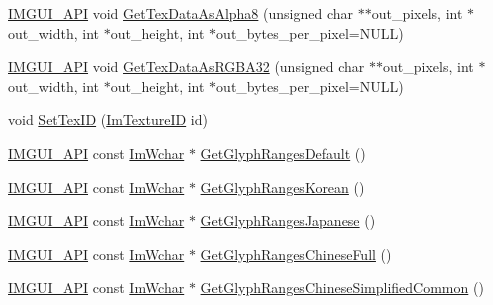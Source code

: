 \begin{DoxyCompactItemize}
\mbox{\hyperlink{imgui_8h_a43829975e84e45d1149597467a14bbf5}{I\+M\+G\+U\+I\+\_\+\+A\+PI}} void \mbox{\hyperlink{struct_im_font_atlas_aeff1a1044a1ab68d8f27bb2819cd9f44}{Get\+Tex\+Data\+As\+Alpha8}} (unsigned char $\ast$$\ast$out\+\_\+pixels, int $\ast$out\+\_\+width, int $\ast$out\+\_\+height, int $\ast$out\+\_\+bytes\+\_\+per\+\_\+pixel=N\+U\+LL)
\item 
\mbox{\hyperlink{imgui_8h_a43829975e84e45d1149597467a14bbf5}{I\+M\+G\+U\+I\+\_\+\+A\+PI}} void \mbox{\hyperlink{struct_im_font_atlas_a8abb0c4e67ebb38249d4df71218c4eec}{Get\+Tex\+Data\+As\+R\+G\+B\+A32}} (unsigned char $\ast$$\ast$out\+\_\+pixels, int $\ast$out\+\_\+width, int $\ast$out\+\_\+height, int $\ast$out\+\_\+bytes\+\_\+per\+\_\+pixel=N\+U\+LL)
\item 
void \mbox{\hyperlink{struct_im_font_atlas_a96ffd1956c11dac4f79b43c095828445}{Set\+Tex\+ID}} (\mbox{\hyperlink{imgui_8h_a364f4447ecbc4ca176145ccff9db6286}{Im\+Texture\+ID}} id)
\item 
\mbox{\hyperlink{imgui_8h_a43829975e84e45d1149597467a14bbf5}{I\+M\+G\+U\+I\+\_\+\+A\+PI}} const \mbox{\hyperlink{imgui_8h_af2c7badaf05a0008e15ef76d40875e97}{Im\+Wchar}} $\ast$ \mbox{\hyperlink{struct_im_font_atlas_adec0df140eb1dc01c2a22a5253d62820}{Get\+Glyph\+Ranges\+Default}} ()
\item 
\mbox{\hyperlink{imgui_8h_a43829975e84e45d1149597467a14bbf5}{I\+M\+G\+U\+I\+\_\+\+A\+PI}} const \mbox{\hyperlink{imgui_8h_af2c7badaf05a0008e15ef76d40875e97}{Im\+Wchar}} $\ast$ \mbox{\hyperlink{struct_im_font_atlas_ac70e07bd35913661c8fc50413b3bf969}{Get\+Glyph\+Ranges\+Korean}} ()
\item 
\mbox{\hyperlink{imgui_8h_a43829975e84e45d1149597467a14bbf5}{I\+M\+G\+U\+I\+\_\+\+A\+PI}} const \mbox{\hyperlink{imgui_8h_af2c7badaf05a0008e15ef76d40875e97}{Im\+Wchar}} $\ast$ \mbox{\hyperlink{struct_im_font_atlas_a2654afbbf73835bf08278cdc6c181a96}{Get\+Glyph\+Ranges\+Japanese}} ()
\item 
\mbox{\hyperlink{imgui_8h_a43829975e84e45d1149597467a14bbf5}{I\+M\+G\+U\+I\+\_\+\+A\+PI}} const \mbox{\hyperlink{imgui_8h_af2c7badaf05a0008e15ef76d40875e97}{Im\+Wchar}} $\ast$ \mbox{\hyperlink{struct_im_font_atlas_ab32e8e79cc4f3b36ef447f70034e7c57}{Get\+Glyph\+Ranges\+Chinese\+Full}} ()
\item 
\mbox{\hyperlink{imgui_8h_a43829975e84e45d1149597467a14bbf5}{I\+M\+G\+U\+I\+\_\+\+A\+PI}} const \mbox{\hyperlink{imgui_8h_af2c7badaf05a0008e15ef76d40875e97}{Im\+Wchar}} $\ast$ \mbox{\hyperlink{struct_im_font_atlas_a3a6b1a8afb01ba5e7c4d86957d6d2625}{Get\+Glyph\+Ranges\+Chinese\+Simplified\+Common}} ()

\end{DoxyCompactItemize}
